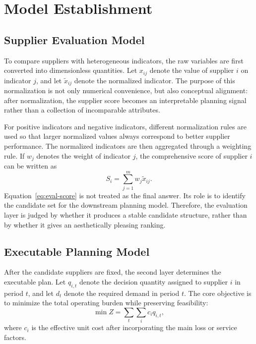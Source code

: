 \section{Model Establishment}

\subsection{Supplier Evaluation Model}

To compare suppliers with heterogeneous indicators, the raw variables are first converted into dimensionless quantities. Let $x_{ij}$ denote the value of supplier $i$ on indicator $j$, and let $\tilde{x}_{ij}$ denote the normalized indicator. The purpose of this normalization is not only numerical convenience, but also conceptual alignment: after normalization, the supplier score becomes an interpretable planning signal rather than a collection of incomparable attributes.

For positive indicators and negative indicators, different normalization rules are used so that larger normalized values always correspond to better supplier performance. The normalized indicators are then aggregated through a weighting rule. If $w_j$ denotes the weight of indicator $j$, the comprehensive score of supplier $i$ can be written as
\begin{equation}
S_i=\sum_{j=1}^{m} w_j \tilde{x}_{ij}.
\label{eq:eval-score}
\end{equation}
Equation~\eqref{eq:eval-score} is not treated as the final answer. Its role is to identify the candidate set for the downstream planning model. Therefore, the evaluation layer is judged by whether it produces a stable candidate structure, rather than by whether it gives an aesthetically pleasing ranking.

\subsection{Executable Planning Model}

After the candidate suppliers are fixed, the second layer determines the executable plan. Let $q_{i,t}$ denote the decision quantity assigned to supplier $i$ in period $t$, and let $d_t$ denote the required demand in period $t$. The core objective is to minimize the total operating burden while preserving feasibility:
\begin{equation}
\min Z=\sum_{t}\sum_{i} c_i q_{i,t},
\label{eq:plan-objective}
\end{equation}
where $c_i$ is the effective unit cost after incorporating the main loss or service factors.

